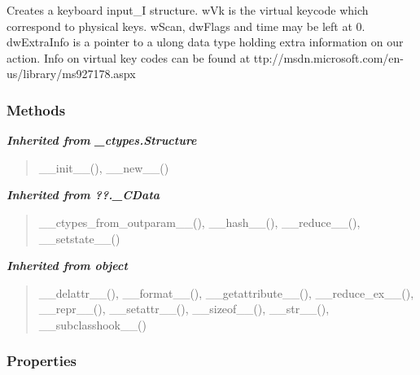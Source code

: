 Creates a keyboard input\_I structure. wVk is the virtual keycode which 
correspond to physical keys. wScan, dwFlags and time may be left at 0. 
dwExtraInfo is a pointer to a ulong data type holding extra information on 
our action. Info on virtual key codes can be found at 
ttp://msdn.microsoft.com/en-us/library/ms927178.aspx



  \subsubsection{Methods}


\large{\textbf{\textit{Inherited from \_ctypes.Structure}}}

\begin{quote}
\_\_init\_\_(), \_\_new\_\_()
\end{quote}

\large{\textbf{\textit{Inherited from ??.\_CData}}}

\begin{quote}
\_\_ctypes\_from\_outparam\_\_(), \_\_hash\_\_(), \_\_reduce\_\_(), \_\_setstate\_\_()
\end{quote}

\large{\textbf{\textit{Inherited from object}}}

\begin{quote}
\_\_delattr\_\_(), \_\_format\_\_(), \_\_getattribute\_\_(), \_\_reduce\_ex\_\_(), \_\_repr\_\_(), \_\_setattr\_\_(), \_\_sizeof\_\_(), \_\_str\_\_(), \_\_subclasshook\_\_()
\end{quote}


  \subsubsection{Properties}

